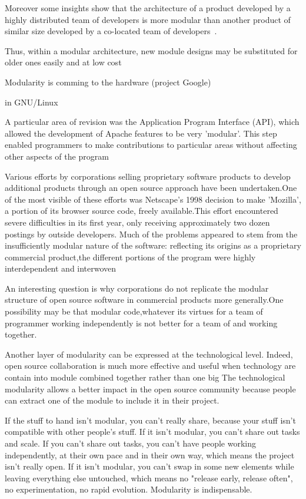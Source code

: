 Moreover some insights show that the architecture of a product developed by a highly distributed team of developers is more modular than another product of similar size developed by a co-located team of developers~\parencite{maccormack2006exploring}.




Thus, within a modular architecture, new module designs may be substituted for older ones easily and at low cost



Modularity is comming to the hardware (project Google)

\parencite{narduzzo2008modularity} in GNU/Linux

\parencite{lerner2002some}
A particular area of revision was the Application Program Interface (API), which allowed the development of Apache features to be very 'modular'. This step enabled programmers to make contributions to particular areas without affecting other aspects of the program

Various efforts by corporations selling proprietary software products to develop additional products through an open source approach have been undertaken.One of the most visible of these efforts was Netscape's 1998 decision to make 'Mozilla', a portion of its browser source code, freely available.This effort encountered severe difficulties in its first year, only receiving approximately two dozen postings by outside developers. Much of the problems appeared to stem from the insufficiently modular nature of the software: reflecting its origins as a proprietary commercial product,the different portions of the program were highly interdependent and interwoven

An interesting question is why corporations do not replicate the modular structure of open source software in commercial products more generally.One possibility may be that modular code,whatever its  virtues for a team of programmer working independently is not better for a team of and working together.




Another layer of modularity can be expressed at the technological level. Indeed, open source collaboration is much more effective and useful when technology are contain into module combined together rather than one big
The technological modularity allows a better impact in the open source community because people can extract one of the module to include it in their project.

If the stuff to hand isn't modular, you can't really share, because your stuff isn't compatible with other people's stuff. If it isn't modular, you can't share out tasks and scale. If you can't share out tasks, you can't have people working independently, at their own pace and in their own way, which means the project isn't really open. If it isn't modular, you can't swap in some new elements while leaving everything else untouched, which means no "release early, release often", no experimentation, no rapid evolution. Modularity is indispensable.


